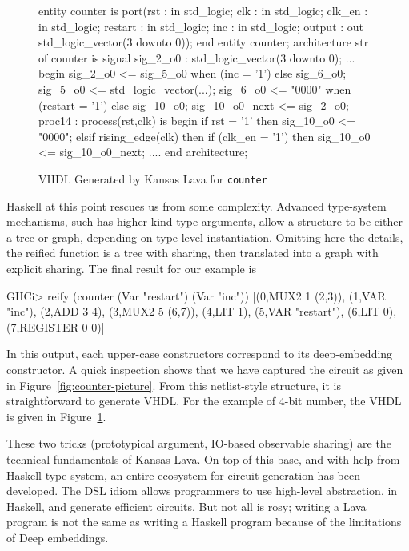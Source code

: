 \documentclass[11pt]{article}
\begin{document}
\begin{figure}[!t]
  \centering
   \begin{minipage}{0.6\textwidth}
     \centering
\footnotesize\begin{Code}[fontsize=\tiny]
entity counter is
  port(rst : in std_logic;
       clk : in std_logic;
       clk_en : in std_logic;
       restart : in std_logic;
       inc : in std_logic;
       output : out std_logic_vector(3 downto 0));
end entity counter;
architecture str of counter is
  signal sig_2_o0 : std_logic_vector(3 downto 0);
  ...
begin
  sig_2_o0 <= sig_5_o0 when (inc = '1')  else sig_6_o0;
  sig_5_o0 <= std_logic_vector(...);
  sig_6_o0 <= "0000" when (restart = '1') else sig_10_o0;
  sig_10_o0_next <= sig_2_o0;
  proc14 : process(rst,clk) is
  begin
    if rst = '1' then
      sig_10_o0 <= "0000";
    elsif rising_edge(clk) then
      if (clk_en = '1') then
        sig_10_o0 <= sig_10_o0_next;
  ....
end architecture;
\end{Code}
  \end{minipage}
  \caption{VHDL Generated by Kansas Lava for {\tt counter}}
  \label{fig:counter-VHDL}
\end{figure}

Haskell at this point rescues us from some complexity. Advanced type-system mechanisms, such has higher-kind type
arguments, allow a structure to be either a tree or graph, depending on type-level instantiation. 
Omitting here the details, the reified function is a tree with sharing,
then translated into a graph with explicit sharing. The final result for our example is
\begin{Code}
GHCi> reify (counter (Var "restart") (Var "inc"))
[(0,MUX2 1 (2,3)),
 (1,VAR "inc"),
 (2,ADD 3 4),
 (3,MUX2 5 (6,7)),
 (4,LIT 1),
 (5,VAR "restart"),
 (6,LIT 0),
 (7,REGISTER 0 0)]
\end{Code}
In this output, each upper-case constructors correspond to its deep-embedding constructor.
A quick inspection shows that we have captured the circuit as given in Figure~\ref{fig:counter-picture}.
From this netlist-style structure, it is straightforward to generate VHDL. For the example
of 4-bit number, the VHDL is given in Figure~\ref{fig:counter-VHDL}.

These two tricks (prototypical argument, IO-based observable sharing) are the technical fundamentals
of Kansas Lava. On top of this base, and with help from Haskell type system, an entire ecosystem
for circuit generation has been developed. The DSL idiom allows programmers to use high-level 
abstraction, in Haskell, and generate efficient circuits. But not all is rosy; writing a Lava
program is not the same as writing a Haskell program because of the limitations of Deep
embeddings.
\end{document}
